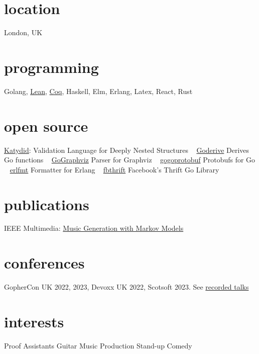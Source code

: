 \documentclass[print]{friggeri-cv-a4} %
\begin{document}

\begin{aside} %
\section{location}
London, UK
\section{programming}
Golang, \href{https://leanprover.github.io/}{Lean}, \href{https://coq.inria.fr/}{Coq}, Haskell, Elm, Erlang, Latex, React, Rust
\section{open source}
\href{https://katydid.github.io}{Katydid}:
Validation Language for Deeply Nested Structures
~
\href{https://git.awalterschulze.org/goderive}{Goderive} 
Derives Go functions
~
\href{https://github.com/awalterschulze/gographviz}{GoGraphviz} 
Parser for Graphviz
~
\href{https://github.com/gogo/protobuf}{gogoprotobuf} 
Protobufs for Go 
~
\href{https://github.com/WhatsApp/erlfmt}{erlfmt}  
Formatter for Erlang
~
\href{https://github.com/facebook/fbthrift}{fbthrift}
Facebook's Thrift Go Library
\section{publications}
IEEE Multimedia: \href{http://doi.ieeecomputersociety.org/10.1109/MMUL.2010.44}{Music Generation with Markov Models}
\section{conferences}
GopherCon UK 2022, 2023, Devoxx UK 2022, Scotsoft 2023.
See \href{https://talks.awalterschulze.org}{\faYoutubePlay recorded talks}
\section{interests}
Proof Assistants
Guitar
Music Production
Stand-up Comedy
\end{aside}
\end{document}
